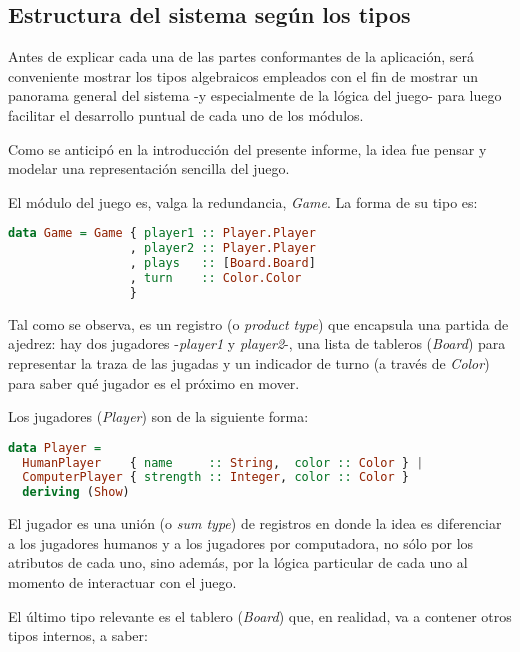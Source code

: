 \documentclass{llncs}
\begin{document}
\subsection{Estructura del sistema según los tipos}

Antes de explicar cada una de las partes conformantes de la aplicación, será conveniente mostrar los tipos algebraicos empleados con el fin de mostrar un panorama general del sistema -y especialmente de la lógica del juego- para luego facilitar el desarrollo puntual de cada uno de los módulos.

Como se anticipó en la introducción del presente informe, la idea fue pensar y modelar una representación sencilla del juego.

El módulo del juego es, valga la redundancia, \textit{Game}. La forma de su tipo es:

\begin{lstlisting}[frame=single, language=haskell, captionpos=b, caption=Tipo de Game, label={lst:tipo_game}]
data Game = Game { player1 :: Player.Player
                 , player2 :: Player.Player
                 , plays   :: [Board.Board]
                 , turn    :: Color.Color
                 }
\end{lstlisting}

Tal como se observa, es un registro (o \textit{product type}) que encapsula una partida de ajedrez: hay dos jugadores -\textit{player1} y \textit{player2}-, una lista de tableros (\textit{Board}) para representar la traza de las jugadas y un indicador de turno (a través de \textit{Color}) para saber qué jugador es el próximo en mover.

Los jugadores (\textit{Player}) son de la siguiente forma:

\begin{lstlisting}[frame=single, language=haskell, captionpos=b, caption=Tipo de Player, label={lst:tipo_player}]
data Player =
  HumanPlayer    { name     :: String,  color :: Color } |
  ComputerPlayer { strength :: Integer, color :: Color }
  deriving (Show)
\end{lstlisting}

El jugador es una unión (o \textit{sum type}) de registros en donde la idea es diferenciar a los jugadores humanos y a los jugadores por computadora, no sólo por los atributos de cada uno, sino además, por la lógica particular de cada uno al momento de interactuar con el juego.

El último tipo relevante es el tablero (\textit{Board}) que, en realidad, va a contener otros tipos internos, a saber:
\end{document}
